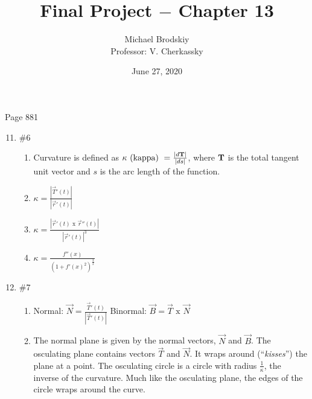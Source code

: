 \documentclass[12pt]{article}
\title{Final Project $-$ Chapter 13}
\date{June 27, 2020}
\author{Michael Brodskiy\\ \small Professor: V. Cherkassky}
\begin{document}
\maketitle

\begin{center}

Page 881

\end{center}

\begin{enumerate}

\setcounter{enumi}{10}

  \item \#6 \begin{enumerate}

      \item Curvature is defined as $\kappa \text{ (kappa) } = \frac{|d\bold{T}|}{|ds|}$, where $\bold{T}$ is the total tangent unit vector and $s$ is the arc length of the function. 

      \item $\kappa = \frac{|\overrightarrow{T}'(t)|}{|\overrightarrow{r}'(t)|}$

      \item $\kappa = \frac{|\overrightarrow{r}'(t)\text{ x }\overrightarrow{r}''(t)|}{|\overrightarrow{r}'(t)|^3}$ 

      \item $\kappa = \frac{f''(x)}{(1+f'(x)^2)^{\frac{3}{2}}}$

    \end{enumerate}

  \item \#7 \begin{enumerate}

      \item Normal: $\overrightarrow{N}=\frac{\overrightarrow{T}'(t)}{|\overrightarrow{T}'(t)|}$ Binormal: $\overrightarrow{B} = \overrightarrow{T} \text{ x } \overrightarrow{N}$

      \item The normal plane is given by the normal vectors, $\overrightarrow{N}$ and $\overrightarrow{B}$. The osculating plane contains vectors $\overrightarrow{T}$ and $\overrightarrow{N}$. It wraps around (``\emph{kisses}'') the plane at a point. The osculating circle is a circle with radius $\frac{1}{\kappa}$, the inverse of the curvature. Much like the osculating plane, the edges of the circle wraps around the curve.

    \end{enumerate}


\end{enumerate}
\end{document}
